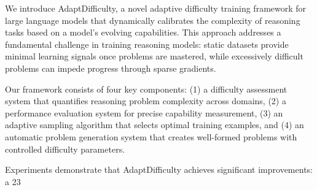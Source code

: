
We introduce AdaptDifficulty, a novel adaptive difficulty training framework for large language models that dynamically calibrates the complexity of reasoning tasks based on a model's evolving capabilities. This approach addresses a fundamental challenge in training reasoning models: static datasets provide minimal learning signals once problems are mastered, while excessively difficult problems can impede progress through sparse gradients.

Our framework consists of four key components: (1) a difficulty assessment system that quantifies reasoning problem complexity across domains, (2) a performance evaluation system for precise capability measurement, (3) an adaptive sampling algorithm that selects optimal training examples, and (4) an automatic problem generation system that creates well-formed problems with controlled difficulty parameters.

Experiments demonstrate that AdaptDifficulty achieves significant improvements: a 23%

\date{April 26, 2025}